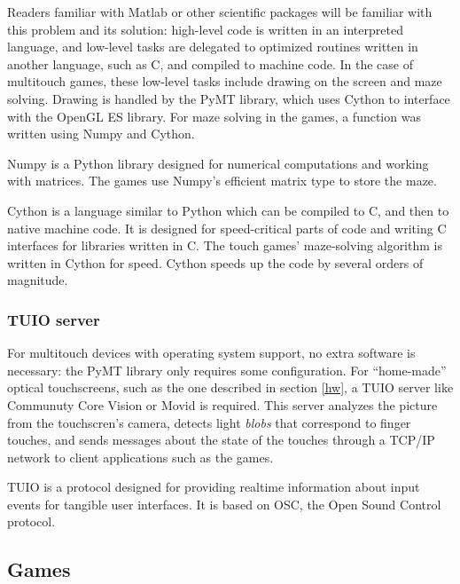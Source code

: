 \documentclass[a4paper,12pt]{article}
\begin{document}
Readers familiar with Matlab or other scientific packages will be familiar with
this problem and its solution: high-level code is written in an interpreted
language, and low-level tasks are delegated to optimized routines written in
another language, such as C, and compiled to machine code.
In the case of multitouch games, these low-level tasks include drawing on the
screen and maze solving.
Drawing is handled by the PyMT library, which uses Cython to interface with
the OpenGL ES library.
For maze solving in the games, a function was written using Numpy and Cython.

Numpy is a Python library designed for numerical computations and working
with matrices.
The games use Numpy's efficient matrix type to store the maze.

Cython is a language similar to Python which can be compiled to C, and then to
native machine code.
It is designed for speed-critical parts of code and writing C interfaces
for libraries written in C.
The touch games' maze-solving algorithm is written in Cython for speed.
Cython speeds up the code by several orders of magnitude.

\subsubsection{TUIO server}


For multitouch devices with operating system support, no extra
software is necessary: the PyMT library only requires some configuration.
For “home-made” optical touchscreens, such as the
one described in section \ref{hw}, a TUIO server like Communuty Core Vision
or Movid is required.
This server analyzes the picture from the touchscren's camera, detects light
\emph{blobs} that correspond to finger touches, and sends messages about the
state of the touches through a TCP/IP network to client applications such as
the games.

TUIO is a protocol designed for providing realtime information about input
events for tangible user interfaces.
It is based on OSC, the Open Sound Control protocol.

\subsection{Games}
\end{document}
